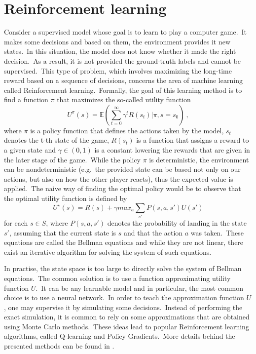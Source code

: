 \documentclass[longabstract, english, mgr]{iithesis}
\theoremstyle{default_theorem_style}\newtheorem{theorem}{Theorem}
\theoremstyle{default_theorem_style}\newtheorem{definition}{Definition}
\begin{document}
\section{Reinforcement learning}\label{sec:reinforcement_learning}

Consider a supervised model whose goal is to learn to play a computer game.\ It makes some decisions and based
on them, the environment provides it new states.\ In this situation, the model does not know whether it made the
right decision.\ As a result, it is not provided the ground-truth labels and cannot be supervised.\ This type of
problem, which involves maximizing the long-time reward based on a sequence of decisions, concerns the area of machine
learning called Reinforcement learning.\ Formally, the goal of this learning method is to find a function $\pi$ that
maximizes the so-called utility function
$$
U^{\pi}(s) = \mathbb{E}(\sum_{t=0}^{\infty} \gamma^t R(s_t) | \pi, s = s_0)\ ,
$$
where $\pi$ is a policy function that defines the actions taken by the model, $s_t$ denotes the t-th state
of the game, $R(s_t)$ is a function that assigns a reward to a given state and $\gamma \in (0, 1)$ is a constant
lowering the rewards that are given in the later stage of the game.\ While the policy $\pi$ is deterministic,
the environment can be nondeterministic (e.g.\ the provided state can be based not only on our actions, but also on
how the other player reacts), thus the expected value is applied.\ The naive way of finding the optimal policy would
be to observe that the optimal utility function is defined by
$$
U^{\star}(s) = R(s) + \gamma max_a \sum_{s'} P(s, a, s') U(s')
$$
for each $s \in S$, where $P(s, a, s')$ denotes the probability of landing in the state $s'$, assuming that the
current state is $s$ and that the action $a$ was taken.\ These equations are called the Bellman equations and while
they are not linear, there exist an iterative algorithm for solving the system of such equations.\newline

\noindent In practise, the state space is too large to directly solve the system of Bellman equations.\ The common
solution is to use a function approximating utility function $U$.\ It can be any learnable model and in
particular, the most common choice is to use a neural network.\ In order to teach the approximation function $U$, one
may supervise it by simulating some decisions.\ Instead of performing the exact simulation, it is common to rely on
some approximations that are obtained using Monte Carlo methods.\ These ideas lead to popular Reinforcement learning
algorithms, called Q-learning and Policy Gradients.\ More details behind the presented methods can be
found in \cite{reinforcement_learning_book}.
\end{document}
